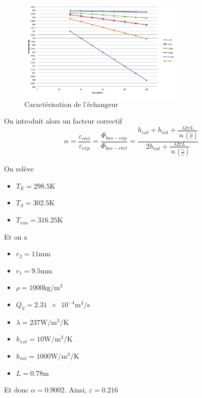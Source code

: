 \documentclass[../PS6_RapportFinal.tex]{subfiles}
\begin{document}
\begin{figure}[!h]
\begin{center}
\includegraphics[width=8cm]{3_3_caracech.png}
\caption{Caractérisation de l'échangeur}
\label{caracech}
\end{center}
\end{figure}

On introduit alors un facteur correctif \[\alpha =\frac{\varepsilon _{réel}}{\varepsilon _{exp}}=\frac{\Phi _{bas-exp}}{\Phi _{bas-réel}}=\frac{h_{ext}+ h_{int}+\frac{\lambda 2\pi L}{\ln (\frac{r_2}{r_1})}}{2 h_{int}+\frac{\lambda 2\pi L}{\ln (\frac{r_2}{r_1})}}\]

\begin{multicols}{2}
On relève
\begin{itemize}
\item \(T_E = \num{298.5} \si{\kelvin} \)
\item \(T_S = \num{302.5} \si{\kelvin}\)
\item \(T_{eau} = \num{316.25} \si{\kelvin}\)
\end{itemize}
\columnbreak
Et on a 
\begin{itemize}
\item \(r_2 = 11\si{\milli\metre} \)
\item \(r_1 = \num{9.5}\si{\milli\metre} \)
\item \(\rho = 1000 \si{\kilo\gram\per\cubic\metre} \)
\item \(Q_V = \num{2.31e-4}\si{\cubic\metre\per\second} \)
\item \(\lambda = 237 \si{\watt\per\cubic\metre\per\kelvin}\)
\item \(h_{ext} = 10 \si{\watt\per\cubic\metre\per\kelvin} \)
\item \(h_{int} = 1000 \si{\watt\per\cubic\metre\per\kelvin}\)
\item \(L = \num{0.78} \si{\metre}\)
\end{itemize}
\end{multicols}
Et donc 
\(\alpha =\num{0.9002} \). Ainsi, \(\varepsilon =\num{0.216}\)
\end{document}
